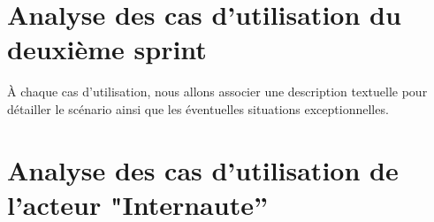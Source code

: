 \section{Analyse des cas d'utilisation du deuxième sprint}
\label{sec:sprint2}

À chaque cas d'utilisation, nous allons associer une description textuelle pour détailler
le scénario ainsi que les éventuelles situations exceptionnelles.

\section{Analyse des cas d'utilisation de l'acteur "Internaute''}
\label{sec:acteur_internaute}

